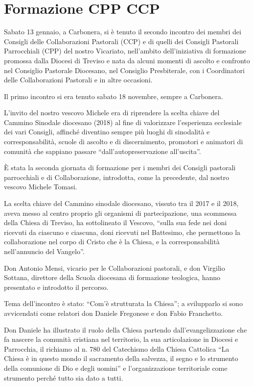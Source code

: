 \section{Formazione CPP CCP}

Sabato 13 gennaio, a Carbonera, si è tenuto il secondo incontro dei membri dei Consigli delle Collaborazioni Pastorali (CCP) e di quelli dei Consigli Pastorali Parrocchiali (CPP) del nostro Vicariato, nell’ambito dell’iniziativa di formazione promossa dalla Diocesi di Treviso e nata da alcuni momenti di ascolto e confronto nel Consiglio Pastorale Diocesano, nel Consiglio Presbiterale, con i Coordinatori delle Collaborazioni Pastorali e in altre occasioni.

Il primo incontro si era tenuto sabato 18 novembre, sempre a Carbonera.

L’invito del nostro vescovo Michele era di riprendere la scelta chiave del Cammino Sinodale diocesano (2018) al fine di valorizzare l’esperienza ecclesiale dei vari Consigli, affinché diventino sempre più luoghi di sinodalità e corresponsabilità, scuole di ascolto e di discernimento, promotori e animatori di comunità che sappiano passare “dall’autopreservazione all’uscita”.

È stata la seconda giornata di formazione per i membri dei Consigli pastorali parrocchiali e di Collaborazione, introdotta, come la precedente, dal nostro vescovo Michele Tomasi.

La scelta chiave del Cammino sinodale diocesano, vissuto tra il 2017 e il 2018, aveva messo al centro proprio gli organismi di partecipazione, una scommessa della Chiesa di Treviso, ha sottolineato il Vescovo, “sulla sua fede nei doni ricevuti da ciascuno e ciascuna, doni ricevuti nel Battesimo, che permettono la collaborazione nel corpo di Cristo che è la Chiesa, e la corresponsabilità nell’annuncio del Vangelo”.

Don Antonio Mensi, vicario per le Collaborazioni pastorali, e don Virgilio Sottana, direttore della Scuola diocesana di formazione teologica, hanno presentato e introdotto il percorso.

Tema dell’incontro è stato: “Com’è strutturata la Chiesa”; a svilupparlo si sono avvicendati come relatori don Daniele Fregonese e don Fabio Franchetto.

Don Daniele ha illustrato il ruolo della Chiesa partendo dall’evangelizzazione che fa nascere la comunità cristiana nel territorio, la sua articolazione in Diocesi e Parrocchia, il richiamo al n. 780 del Catechismo della Chiesa Cattolica “La Chiesa è in questo mondo il sacramento della salvezza, il segno e lo strumento della comunione di Dio e degli uomini” e l’organizzazione territoriale come strumento perché tutto sia dato a tutti.

